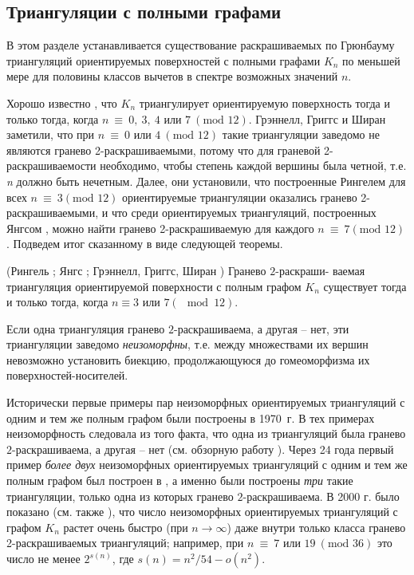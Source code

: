 \subsection{Триангуляции с полными графами}

В этом разделе устанавливается существование раскрашиваемых по Грюнбауму триангуляций ориентируемых поверхностей с полными графами $K_n$ по меньшей мере для половины классов вычетов в спектре возможных значений $n$.

Хорошо известно \cite{ringel}, что $K_n$ триангулирует ориентируемую поверхность тогда и только тогда, когда $n\ \equiv\ 0,\ 3,\ 4 \text{ или } 7\ (\text{mod }12)$. Грэннелл, Григгс и Ширан \cite{granel1} заметили, что при $n\ \equiv\ 0 \text{ или }4\ (\text{mod }12)$ такие триангуляции заведомо не являются гранево 2-раскрашиваемыми, потому что для граневой 2-раскрашиваемости необходимо, чтобы степень каждой вершины была четной, т.е. \textit{n} должно быть нечетным. Далее, они установили, что построенные Рингелем \cite{ringel} для всех $n\ \equiv\ 3 (\text{mod }12)$ ориентируемые триангуляции оказались гранево 2-раскрашиваемыми, и что среди ориентируемых триангуляций, построенных Янгсом \cite{yungjwt}, можно найти гранево 2-раскрашиваемую для каждого $n\ \equiv\ 7 (\text{mod }12)$. Подведем итог сказанному в виде следующей теоремы.

\begin{theorem}
\label{akm2.th3}
(Рингель \cite{ringel}; Янгс \cite{yungjwt}; Грэннелл, Григгс, Ширан \cite{granel1}) Гранево $2$-раскраши- \linebreak ваемая триангуляция ориентируемой поверхности с полным графом $K_n$ существует тогда и только тогда, когда $n \equiv 3$ или $7 (\mod 12)$.
\end{theorem}


Если одна триангуляция гранево $2$-раскрашиваема, а другая -- нет, эти триангуляции заведомо \textit{неизоморфны}, т.е. между множествами их вершин невозможно установить биекцию, продолжающуюся до гомеоморфизма их поверхностей-носителей.

Исторически первые примеры пар неизоморфных ориентируемых триангуляций с одним и тем же полным графом были построены \cite{yungjwt} в 1970~г. В тех примерах неизоморфность следовала из того факта, что одна из триангуляций была гранево $2$-раскрашиваема, а другая -- нет (см. обзорную работу \cite{granel2}). Через 24 года первый пример \textit{более двух} неизоморфных ориентируемых триангуляций с одним и тем же полным графом был построен в \cite{lawrnegam}, а именно были построены \textit{три} такие триангуляции, только одна из которых гранево $2$-раскрашиваема. В 2000 г. было показано \cite{granel3} (см. также \cite{granel2}), что число неизоморфных ориентируемых триангуляций с графом $K_n$ растет очень быстро (при $n\to\infty$) даже внутри только класса гранево 2-раскрашиваемых триангуляций; например, при $n\ \equiv\ 7\text{ или }19\ (\text{mod }36)$ это число не менее $2^{s(n)}$, где $s(n) = n^2/54 - o(n^2)$.

